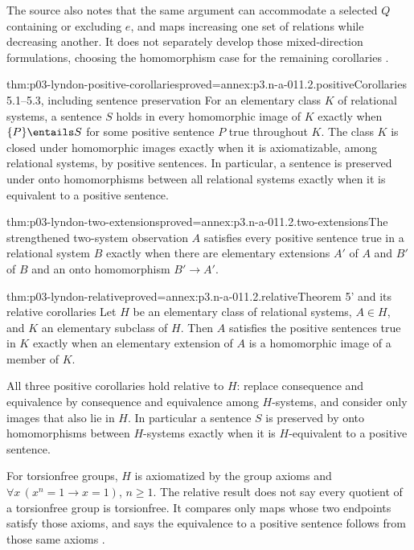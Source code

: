The source also notes that the same argument can accommodate a selected
\(Q\) containing or excluding \(e\), and maps increasing one set of
relations while decreasing another. It does not separately develop those
mixed-direction formulations, choosing the homomorphism case for the
remaining corollaries \cite[p.~150]{Lyndon1959}.

\begin{hbcorollary}{thm:p03-lyndon-positive-corollaries}{proved=annex:p3.n-a-011.2.positive}{Corollaries 5.1--5.3, including sentence preservation}
For an elementary class \(K\) of relational systems, a sentence \(S\)
holds in every homomorphic image of \(K\) exactly when
\(\{P\}\entails S\) for some positive sentence \(P\) true throughout
\(K\). The class \(K\) is closed under homomorphic images exactly
when it is axiomatizable, among relational systems, by positive sentences.
In particular, a sentence is preserved under onto homomorphisms between
all relational systems exactly when it is equivalent to a positive sentence.
\end{hbcorollary}

\begin{hbtheorem}{thm:p03-lyndon-two-extensions}{proved=annex:p3.n-a-011.2.two-extensions}{The strengthened two-system observation}
\(A\) satisfies every positive sentence true in a relational system
\(B\) exactly when there are elementary extensions \(A'\) of \(A\)
and \(B'\) of \(B\) and an onto homomorphism \(B'\to A'\).
\end{hbtheorem}

\begin{hbtheorem}{thm:p03-lyndon-relative}{proved=annex:p3.n-a-011.2.relative}{Theorem 5' and its relative corollaries}
Let \(H\) be an elementary class of relational systems, \(A\in H\),
and \(K\) an elementary subclass of \(H\). Then \(A\) satisfies the
positive sentences true in \(K\) exactly when an elementary extension
of \(A\) is a homomorphic image of a member of \(K\).

All three positive corollaries hold relative to \(H\): replace consequence
and equivalence by consequence and equivalence among \(H\)-systems,
and consider only images that also lie in \(H\). In particular a sentence
\(S\) is preserved by onto homomorphisms between \(H\)-systems exactly
when it is \(H\)-equivalent to a positive sentence.
\end{hbtheorem}

For torsionfree groups, \(H\) is axiomatized by the group axioms and
\(\forall x\,(x^n=1\to x=1)\), \(n\geq1\). The relative result
does not say every quotient of a torsionfree group is torsionfree. It
compares only maps whose two endpoints satisfy those axioms, and says the
equivalence to a positive sentence follows from those same axioms
\cite[p.~151]{Lyndon1959}.

